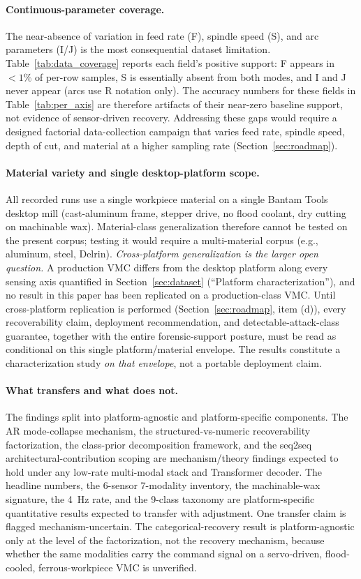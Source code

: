 \documentclass[sensors,article,submit,moreauthors,pdftex]{Definitions/mdpi}
\begin{document}
\paragraph{Continuous-parameter coverage.} The near-absence of variation in feed rate (F), spindle speed (S), and arc parameters (I/J) is the most consequential dataset limitation. Table~\ref{tab:data_coverage} reports each field's positive support: F appears in $<\!1\%$ of per-row samples, S is essentially absent from both modes, and I and J never appear (arcs use R notation only). The accuracy numbers for these fields in Table~\ref{tab:per_axis} are therefore artifacts of their near-zero baseline support, not evidence of sensor-driven recovery. Addressing these gaps would require a designed factorial data-collection campaign that varies feed rate, spindle speed, depth of cut, and material at a higher sampling rate (Section~\ref{sec:roadmap}).

\paragraph{Material variety and single desktop-platform scope.} All recorded runs use a single workpiece material on a single Bantam Tools desktop mill (cast-aluminum frame, stepper drive, no flood coolant, dry cutting on machinable wax). Material-class generalization therefore cannot be tested on the present corpus; testing it would require a multi-material corpus (e.g., aluminum, steel, Delrin). \emph{Cross-platform generalization is the larger open question.} A production VMC differs from the desktop platform along every sensing axis quantified in Section~\ref{sec:dataset} (``Platform characterization''), and no result in this paper has been replicated on a production-class VMC. Until cross-platform replication is performed (Section~\ref{sec:roadmap}, item (d)), every recoverability claim, deployment recommendation, and detectable-attack-class guarantee, together with the entire forensic-support posture, must be read as conditional on this single platform/material envelope. The results constitute a characterization study \emph{on that envelope}, not a portable deployment claim.

\paragraph{What transfers and what does not.} The findings split into platform-agnostic and platform-specific components. The AR mode-collapse mechanism, the structured-vs-numeric recoverability factorization, the class-prior decomposition framework, and the seq2seq architectural-contribution scoping are mechanism/theory findings expected to hold under any low-rate multi-modal stack and Transformer decoder. The headline numbers, the 6-sensor 7-modality inventory, the machinable-wax signature, the 4~Hz rate, and the 9-class taxonomy are platform-specific quantitative results expected to transfer with adjustment. One transfer claim is flagged mechanism-uncertain. The categorical-recovery result is platform-agnostic only at the level of the factorization, not the recovery mechanism, because whether the same modalities carry the command signal on a servo-driven, flood-cooled, ferrous-workpiece VMC is unverified.
\end{document}
